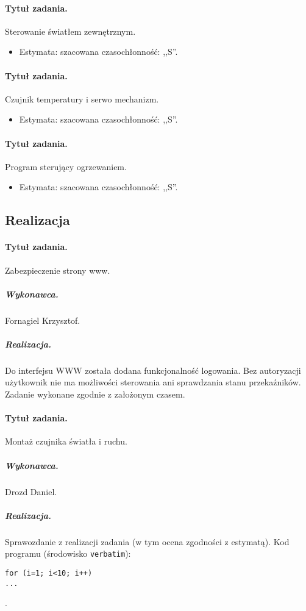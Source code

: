 \paragraph{Tytuł zadania.} Sterowanie światłem zewnętrznym.
\begin{itemize}
	\item Estymata: szacowana czasochłonność: ,,S''.
\end{itemize}

\paragraph{Tytuł zadania.} Czujnik temperatury i serwo mechanizm.
\begin{itemize}
	\item Estymata: szacowana czasochłonność: ,,S''.
\end{itemize}

\paragraph{Tytuł zadania.} Program sterujący ogrzewaniem.
\begin{itemize}
	\item Estymata: szacowana czasochłonność: ,,S''.
\end{itemize}


\subsection{Realizacja}

\paragraph{Tytuł zadania.} Zabezpieczenie strony www.
\subparagraph{Wykonawca.} Fornagiel Krzysztof.
\subparagraph{Realizacja.} Do interfejsu WWW została dodana funkcjonalność logowania. Bez autoryzacji użytkownik nie ma możliwości sterowania ani sprawdzania stanu przekaźników. Zadanie wykonane zgodnie z założonym czasem.

\paragraph{Tytuł zadania.} Montaż czujnika światła i ruchu.
\subparagraph{Wykonawca.} Drozd Daniel.
\subparagraph{Realizacja.} Sprawozdanie z realizacji zadania (w tym ocena zgodności z estymatą). Kod programu (środowisko \texttt{verbatim}): \begin{verbatim}
for (i=1; i<10; i++)
...
\end{verbatim}.


